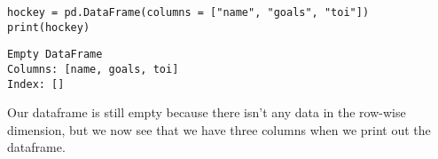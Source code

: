 \begin{lstlisting}[style=pippython]
hockey = pd.DataFrame(columns = ["name", "goals", "toi"])
print(hockey)
\end{lstlisting}
\begin{lstlisting}[style=pippython]
Empty DataFrame
Columns: [name, goals, toi]
Index: []
\end{lstlisting}
Our dataframe is still empty because there isn't any data in the row-wise dimension, but we now see that we have three columns when we print out the dataframe.
